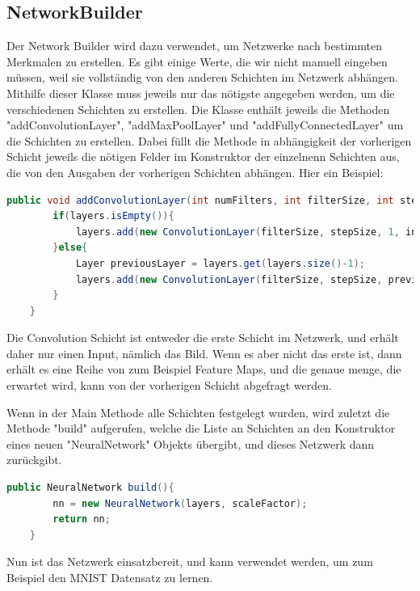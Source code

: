 \documentclass[12pt]{article}
\begin{document}
\subsection{NetworkBuilder}
Der Network Builder wird dazu verwendet, um Netzwerke nach bestimmten Merkmalen zu erstellen. Es gibt einige Werte, die wir nicht manuell eingeben müssen, weil sie vollständig von den anderen Schichten im Netzwerk abhängen. Mithilfe dieser Klasse muss jeweils nur das nötigste angegeben werden, um die verschiedenen Schichten zu erstellen.
Die Klasse enthält jeweils die Methoden "addConvolutionLayer", "addMaxPoolLayer" und "addFullyConnectedLayer" um die Schichten zu erstellen. Dabei füllt die Methode in abhängigkeit der vorherigen Schicht jeweils die nötigen Felder im Konstruktor der einzelnenn Schichten aus, die von den Ausgaben der vorherigen Schichten abhängen. Hier ein Beispiel:
\begin{lstlisting}[language=Java]
public void addConvolutionLayer(int numFilters, int filterSize, int stepSize, double learnRate){
        if(layers.isEmpty()){
            layers.add(new ConvolutionLayer(filterSize, stepSize, 1, inputRows, inputCols, numFilters, learnRate));
        }else{
            Layer previousLayer = layers.get(layers.size()-1);
            layers.add(new ConvolutionLayer(filterSize, stepSize, previousLayer.getOutputLength(), previousLayer.getOutputRows(), previousLayer.getOutputCols(), numFilters, learnRate));
        }
    }
\end{lstlisting}
Die Convolution Schicht ist entweder die erste Schicht im Netzwerk, und erhält daher nur einen Input, nämlich das Bild. Wenn es aber nicht das erste ist, dann erhält es eine Reihe von zum Beispiel Feature Maps, und die genaue menge, die erwartet wird, kann von der vorherigen Schicht abgefragt werden.

Wenn in der Main Methode alle Schichten festgelegt wurden, wird zuletzt die Methode "build" aufgerufen, welche die Liste an Schichten an den Konstruktor eines neuen "NeuralNetwork" Objekts übergibt, und dieses Netzwerk dann zurückgibt.
\begin{lstlisting}[language=Java]
public NeuralNetwork build(){
        nn = new NeuralNetwork(layers, scaleFactor);
        return nn;
    }
\end{lstlisting}

Nun ist das Netzwerk einsatzbereit, und kann verwendet werden, um zum Beispiel den MNIST Datensatz zu lernen.
\end{document}
